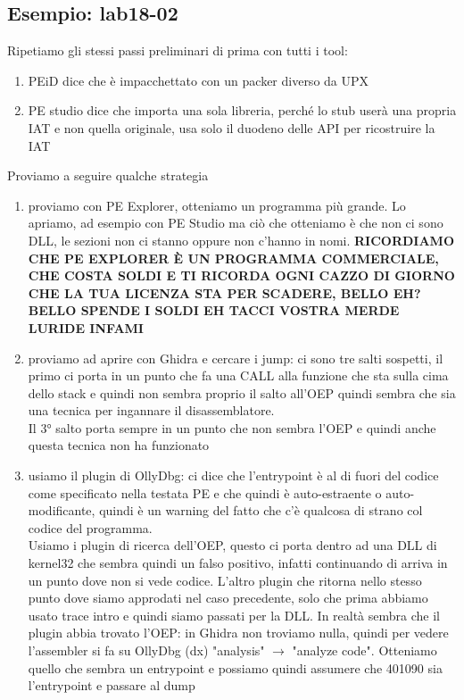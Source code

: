 \documentclass[12pt, oneside]{extbook}
\begin{document}
\subsection{Esempio: lab18-02}
Ripetiamo gli stessi passi preliminari di prima con tutti i tool:
\begin{enumerate}
\item PEiD dice che è impacchettato con un packer diverso da UPX
\item PE studio dice che importa una sola libreria, perché lo stub userà una propria IAT e non quella originale, usa solo il duodeno delle API per ricostruire la IAT
\end{enumerate}
Proviamo a seguire qualche strategia
\begin{enumerate}
\item proviamo con PE Explorer, otteniamo un programma più grande. Lo apriamo, ad esempio con PE Studio ma ciò che otteniamo è che non ci sono DLL, le sezioni non ci stanno oppure non c'hanno in nomi. \textbf{\textsc{RICORDIAMO CHE PE EXPLORER È UN PROGRAMMA COMMERCIALE, CHE COSTA SOLDI E TI RICORDA OGNI CAZZO DI GIORNO CHE LA TUA LICENZA STA PER SCADERE, BELLO EH? BELLO SPENDE I SOLDI EH TACCI VOSTRA MERDE LURIDE INFAMI}}
\item proviamo ad aprire con Ghidra e cercare i jump: ci sono tre salti sospetti, il primo ci porta in un punto che fa una CALL alla funzione che sta sulla cima dello stack e quindi non sembra proprio il salto all'OEP quindi sembra che sia una tecnica per ingannare il disassemblatore.\\Il 3° salto porta sempre in un punto che non sembra l'OEP e quindi anche questa tecnica non ha funzionato
\item usiamo il plugin di OllyDbg: ci dice che l'entrypoint è al di fuori del codice come specificato nella testata PE e che quindi è auto-estraente o auto-modificante, quindi è un warning del fatto che c'è qualcosa di strano col codice del programma.\\Usiamo i plugin di ricerca dell'OEP, questo ci porta dentro ad una DLL di kernel32 che sembra quindi un falso positivo, infatti continuando di arriva in un punto dove non si vede codice. L'altro plugin che ritorna nello stesso punto dove siamo approdati nel caso precedente, solo che prima abbiamo usato trace intro e quindi siamo passati per la DLL. In realtà sembra che il plugin abbia trovato l'OEP: in Ghidra non troviamo nulla, quindi per vedere l'assembler si fa su OllyDbg (dx) "analysis" $\rightarrow$ "analyze code". Otteniamo quello che sembra un entrypoint e possiamo quindi assumere che 401090 sia l'entrypoint e passare al dump
\end{enumerate}
\end{document}
